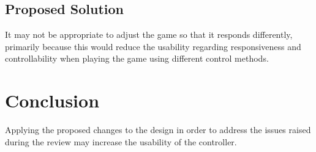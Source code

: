 \documentclass{scrartcl}
\begin{document}
\subsection{Proposed Solution}
It may not be appropriate to adjust the game so that it responds differently, primarily because this would reduce the usability regarding responsiveness and controllability when playing the game using different control methods.

\section{Conclusion}
Applying the proposed changes to the design in order to address the issues raised during the review may increase the usability of the controller.


\end{document}
